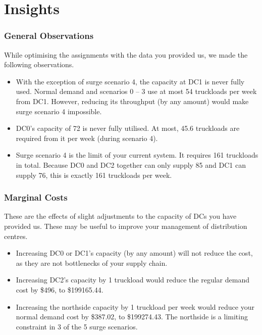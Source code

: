 \documentclass[11pt,a4paper]{article}
\begin{document}
\part{Insights}
\section{General Observations}
While optimising the assignments with the data you provided us, we made 
the following observations.
\begin{itemize}
    \item With the exception of surge scenario 4, the capacity at DC1 is never 
fully used. Normal demand and scenarios 0 -- 3 use at most 54 truckloads per week 
from DC1. However, reducing its throughput (by any amount) would make surge scenario 4
impossible.
    \item DC0's capacity of 72 is never fully utilised. At most, 45.6 truckloads are 
    required from it per week (during scenario 4).
    \item Surge scenario 4 is the limit of your current system. It requires 161 truckloads 
    in total. Because DC0 and DC2 together can only supply 85 and DC1 can supply 76, this is 
    exactly 161 truckloads per week. 
\end{itemize}

\section{Marginal Costs}
These are the effects of slight adjustments to the capacity of DCs 
 you have provided us. These may be useful to improve your management of 
 distribution centres. 
\begin{itemize}
    \item Increasing DC0 or DC1's capacity 
    (by any amount) will not reduce the cost, as they are not bottlenecks of your supply chain.
    \item Increasing DC2's capacity by 1 truckload would 
    reduce the regular demand cost by \$496, to \$199165.44.
    \item Increasing the northside capacity by 1 truckload per week would reduce your
    normal demand cost by \$387.02, to \$199274.43. The northside is a limiting 
    constraint in 3 of the 5 surge scenarios.
\end{itemize}
\end{document}
